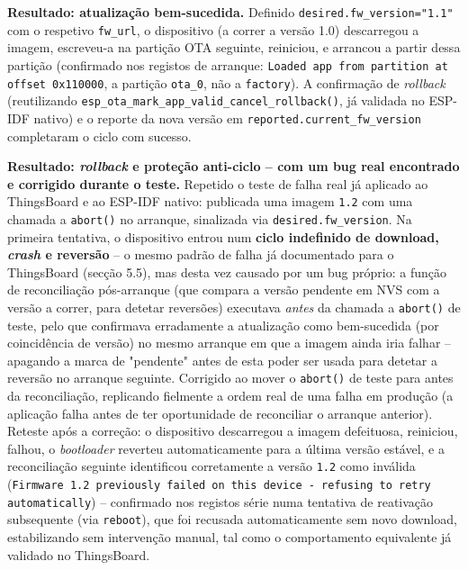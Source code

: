 \documentclass[a4paper,12pt]{article}
\begin{document}
\textbf{Resultado: atualização bem-sucedida.} Definido \texttt{desired.fw\_version="1.1"} com o respetivo \texttt{fw\_url}, o dispositivo (a correr a versão 1.0) descarregou a imagem, escreveu-a na partição OTA seguinte, reiniciou, e arrancou a partir dessa partição (confirmado nos registos de arranque: \texttt{Loaded app from partition at offset 0x110000}, a partição \texttt{ota\_0}, não a \texttt{factory}). A confirmação de \textit{rollback} (reutilizando \texttt{esp\_ota\_mark\_app\_valid\_cancel\_rollback()}, já validada no ESP-IDF nativo) e o reporte da nova versão em \texttt{reported.current\_fw\_version} completaram o ciclo com sucesso.

\textbf{Resultado: \textit{rollback} e proteção anti-ciclo -- com um bug real encontrado e corrigido durante o teste.} Repetido o teste de falha real já aplicado ao ThingsBoard e ao ESP-IDF nativo: publicada uma imagem \texttt{1.2} com uma chamada a \texttt{abort()} no arranque, sinalizada via \texttt{desired.fw\_version}. Na primeira tentativa, o dispositivo entrou num \textbf{ciclo indefinido de download, \textit{crash} e reversão} -- o mesmo padrão de falha já documentado para o ThingsBoard (secção 5.5), mas desta vez causado por um bug próprio: a função de reconciliação pós-arranque (que compara a versão pendente em NVS com a versão a correr, para detetar reversões) executava \textit{antes} da chamada a \texttt{abort()} de teste, pelo que confirmava erradamente a atualização como bem-sucedida (por coincidência de versão) no mesmo arranque em que a imagem ainda iria falhar -- apagando a marca de "pendente" antes de esta poder ser usada para detetar a reversão no arranque seguinte. Corrigido ao mover o \texttt{abort()} de teste para antes da reconciliação, replicando fielmente a ordem real de uma falha em produção (a aplicação falha antes de ter oportunidade de reconciliar o arranque anterior). Reteste após a correção: o dispositivo descarregou a imagem defeituosa, reiniciou, falhou, o \textit{bootloader} reverteu automaticamente para a última versão estável, e a reconciliação seguinte identificou corretamente a versão \texttt{1.2} como inválida (\texttt{Firmware 1.2 previously failed on this device - refusing to retry automatically}) -- confirmado nos registos série numa tentativa de reativação subsequente (via \texttt{reboot}), que foi recusada automaticamente sem novo download, estabilizando sem intervenção manual, tal como o comportamento equivalente já validado no ThingsBoard.
\end{document}
